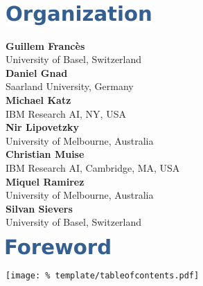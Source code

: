 \documentclass[letterpaper]{article}
\begin{document}

\cleardoublepage

\vspace*{5mm}
\includegraphics[trim={15pt 0pt 0pt 0pt}]{template/organization.pdf}






\vspace*{14mm}
\noindent
\textbf{Guillem Franc\`es}\\
University of Basel, Switzerland\\[1em]
\textbf{Daniel Gnad}\\
Saarland University, Germany\\[1em]
\textbf{Michael Katz}\\ 
IBM Research AI, NY, USA\\[1em]
\textbf{Nir Lipovetzky}\\
University of Melbourne, Australia\\[1em]
\textbf{Christian Muise}\\
IBM Research AI, Cambridge, MA, USA\\[1em] 
\textbf{Miquel Ramirez}\\
University of Melbourne, Australia\\[1em]
\textbf{Silvan Sievers}\\ 
University of Basel, Switzerland

\clearpage

\vspace*{5mm}
\includegraphics[trim={15pt 0pt 0pt 0pt}]{template/preface.pdf}


\clearpage

\vspace*{5mm}
\texttt{[image: \%
 template/tableofcontents.pdf]}

\renewcommand\contentsname{}
\tableofcontents

\cleardoublepage
{}

\end{document}

